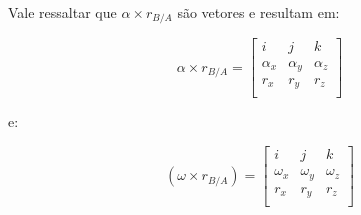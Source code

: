 Vale ressaltar que \(\alpha \times r_{B/A}\) são vetores e resultam em:

\begin{equation}
    \alpha \times r_{B/A} = \begin{bmatrix}
                                i        & j        & k        \\
                                \alpha_x & \alpha_y & \alpha_z \\
                                r_x      & r_y      & r_z      \\
    \end{bmatrix}
\end{equation}

e:

\begin{equation}
    \left( \omega \times r_{B/A} \right) = \begin{bmatrix}
                                               i        & j        & k        \\
                                               \omega_x & \omega_y & \omega_z \\
                                               r_x      & r_y      & r_z      \\
    \end{bmatrix}
\end{equation}
